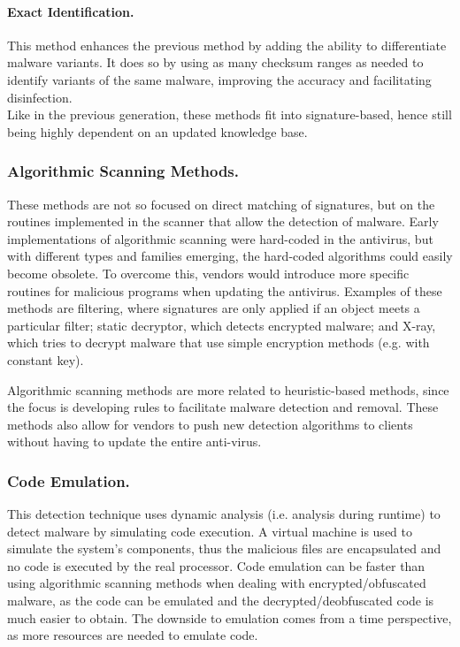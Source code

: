 \paragraph{Exact Identification.} This method enhances the previous method by adding the ability to differentiate malware variants. It does so by using as many checksum ranges as needed to identify variants of the same malware, improving the accuracy and facilitating disinfection.\\

Like in the previous generation, these methods fit into signature-based, hence still being highly dependent on an updated knowledge base.

\subsubsection{Algorithmic Scanning Methods.} These methods are not so focused on direct matching of signatures, but on the routines implemented in the scanner that allow the detection of malware. Early implementations of algorithmic scanning were hard-coded in the antivirus, but with different types and families emerging, the hard-coded algorithms could easily become obsolete. To overcome this, vendors would introduce more specific routines for malicious programs when updating the antivirus. Examples of these methods are filtering, where signatures are only applied if an object meets a particular filter; static decryptor, which detects encrypted malware; and X-ray, which tries to decrypt malware that use simple encryption methods (e.g.  with constant key).

Algorithmic scanning methods are more related to heuristic-based methods, since the focus is developing rules to facilitate malware detection and removal. These methods also allow for vendors to push new detection algorithms to clients without having to update the entire anti-virus.

\subsubsection{Code Emulation.} This detection technique uses dynamic analysis (i.e. analysis during runtime) to detect malware by simulating code execution. A virtual machine is used to simulate the system's components, thus the malicious files are encapsulated and no code is executed by the real processor. Code emulation can be faster than using algorithmic scanning methods when dealing with encrypted/obfuscated malware, as the code can be emulated and the decrypted/deobfuscated code is much easier to obtain. The downside to emulation comes from a time perspective, as more resources are needed to emulate code.

